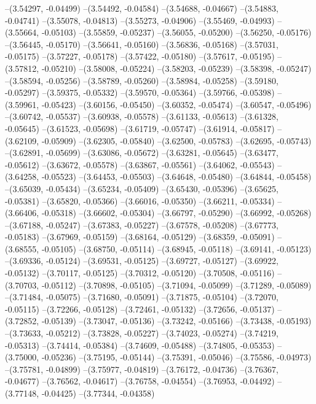 --(3.54297, -0.04499)
--(3.54492, -0.04584)
--(3.54688, -0.04667)
--(3.54883, -0.04741)
--(3.55078, -0.04813)
--(3.55273, -0.04906)
--(3.55469, -0.04993)
--(3.55664, -0.05103)
--(3.55859, -0.05237)
--(3.56055, -0.05200)
--(3.56250, -0.05176)
--(3.56445, -0.05170)
--(3.56641, -0.05160)
--(3.56836, -0.05168)
--(3.57031, -0.05175)
--(3.57227, -0.05178)
--(3.57422, -0.05180)
--(3.57617, -0.05195)
--(3.57812, -0.05210)
--(3.58008, -0.05224)
--(3.58203, -0.05239)
--(3.58398, -0.05247)
--(3.58594, -0.05256)
--(3.58789, -0.05260)
--(3.58984, -0.05258)
--(3.59180, -0.05297)
--(3.59375, -0.05332)
--(3.59570, -0.05364)
--(3.59766, -0.05398)
--(3.59961, -0.05423)
--(3.60156, -0.05450)
--(3.60352, -0.05474)
--(3.60547, -0.05496)
--(3.60742, -0.05537)
--(3.60938, -0.05578)
--(3.61133, -0.05613)
--(3.61328, -0.05645)
--(3.61523, -0.05698)
--(3.61719, -0.05747)
--(3.61914, -0.05817)
--(3.62109, -0.05909)
--(3.62305, -0.05840)
--(3.62500, -0.05783)
--(3.62695, -0.05743)
--(3.62891, -0.05699)
--(3.63086, -0.05672)
--(3.63281, -0.05645)
--(3.63477, -0.05612)
--(3.63672, -0.05578)
--(3.63867, -0.05561)
--(3.64062, -0.05543)
--(3.64258, -0.05523)
--(3.64453, -0.05503)
--(3.64648, -0.05480)
--(3.64844, -0.05458)
--(3.65039, -0.05434)
--(3.65234, -0.05409)
--(3.65430, -0.05396)
--(3.65625, -0.05381)
--(3.65820, -0.05366)
--(3.66016, -0.05350)
--(3.66211, -0.05334)
--(3.66406, -0.05318)
--(3.66602, -0.05304)
--(3.66797, -0.05290)
--(3.66992, -0.05268)
--(3.67188, -0.05247)
--(3.67383, -0.05227)
--(3.67578, -0.05208)
--(3.67773, -0.05183)
--(3.67969, -0.05159)
--(3.68164, -0.05129)
--(3.68359, -0.05091)
--(3.68555, -0.05105)
--(3.68750, -0.05114)
--(3.68945, -0.05118)
--(3.69141, -0.05123)
--(3.69336, -0.05124)
--(3.69531, -0.05125)
--(3.69727, -0.05127)
--(3.69922, -0.05132)
--(3.70117, -0.05125)
--(3.70312, -0.05120)
--(3.70508, -0.05116)
--(3.70703, -0.05112)
--(3.70898, -0.05105)
--(3.71094, -0.05099)
--(3.71289, -0.05089)
--(3.71484, -0.05075)
--(3.71680, -0.05091)
--(3.71875, -0.05104)
--(3.72070, -0.05115)
--(3.72266, -0.05128)
--(3.72461, -0.05132)
--(3.72656, -0.05137)
--(3.72852, -0.05139)
--(3.73047, -0.05136)
--(3.73242, -0.05166)
--(3.73438, -0.05193)
--(3.73633, -0.05212)
--(3.73828, -0.05227)
--(3.74023, -0.05274)
--(3.74219, -0.05313)
--(3.74414, -0.05384)
--(3.74609, -0.05488)
--(3.74805, -0.05353)
--(3.75000, -0.05236)
--(3.75195, -0.05144)
--(3.75391, -0.05046)
--(3.75586, -0.04973)
--(3.75781, -0.04899)
--(3.75977, -0.04819)
--(3.76172, -0.04736)
--(3.76367, -0.04677)
--(3.76562, -0.04617)
--(3.76758, -0.04554)
--(3.76953, -0.04492)
--(3.77148, -0.04425)
--(3.77344, -0.04358)
